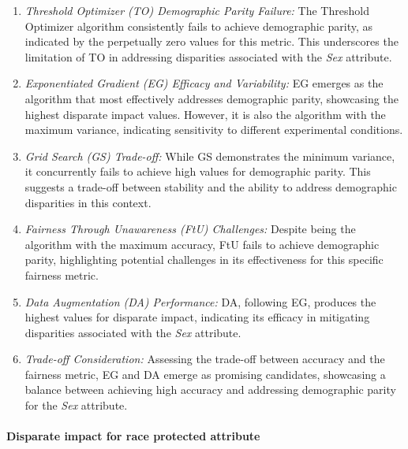 \begin{enumerate}
    \item \emph{Threshold Optimizer (TO) Demographic Parity Failure:} The Threshold Optimizer algorithm consistently fails to achieve demographic parity, as indicated by the perpetually zero values for this metric. This underscores the limitation of TO in addressing disparities associated with the \emph{Sex} attribute.

    \item \emph{Exponentiated Gradient (EG) Efficacy and Variability:} EG emerges as the algorithm that most effectively addresses demographic parity, showcasing the highest disparate impact values. However, it is also the algorithm with the maximum variance, indicating sensitivity to different experimental conditions.

    \item \emph{Grid Search (GS) Trade-off:} While GS demonstrates the minimum variance, it concurrently fails to achieve high values for demographic parity. This suggests a trade-off between stability and the ability to address demographic disparities in this context.

    \item \emph{Fairness Through Unawareness (FtU) Challenges:} Despite being the algorithm with the maximum accuracy, FtU fails to achieve demographic parity, highlighting potential challenges in its effectiveness for this specific fairness metric.

    \item \emph{Data Augmentation (DA) Performance:} DA, following EG, produces the highest values for disparate impact, indicating its efficacy in mitigating disparities associated with the \emph{Sex} attribute.

    \item \emph{Trade-off Consideration:} Assessing the trade-off between accuracy and the fairness metric, EG and DA emerge as promising candidates, showcasing a balance between achieving high accuracy and addressing demographic parity for the \emph{Sex} attribute.
\end{enumerate}

\paragraph{Disparate impact for race protected attribute}

